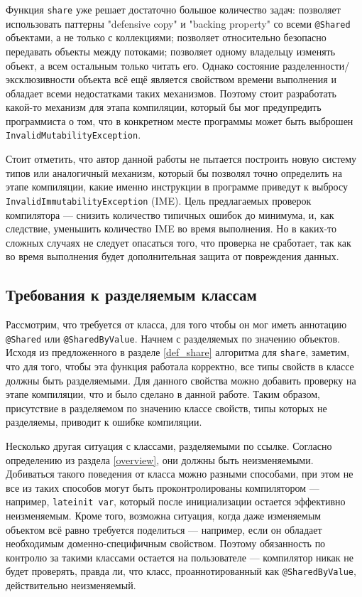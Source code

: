 \documentclass[specification,annotation,times]{itmo-student-thesis}
\begin{document}
Функция \texttt{share} уже решает достаточно большое количество задач: позволяет использовать паттерны "defensive copy" и "backing property" со всеми \texttt{@Shared} объектами, а не только с коллекциями; позволяет относительно безопасно передавать объекты между потоками; позволяет одному владельцу изменять объект, а всем остальным только читать его.
Однако состояние разделенности/эксклюзивности объекта всё ещё является свойством времени выполнения и обладает всеми недостатками таких механизмов. 
Поэтому стоит разработать какой-то механизм для этапа компиляции, который бы мог предупредить программиста о том, что в конкретном месте программы может быть выброшен \texttt{InvalidMutabilityException}.

Стоит отметить, что автор данной работы не пытается построить новую систему типов или аналогичный механизм, который бы позволял точно определить на этапе компиляции, какие именно инструкции в программе приведут к выбросу \texttt{InvalidImmutabilityException} (IME).
Цель предлагаемых проверок компилятора --- снизить количество типичных ошибок до минимума, и, как следствие, уменьшить количество IME во время выполнения.
Но в каких-то сложных случаях не следует опасаться того, что проверка не сработает,
так как во время выполнения будет дополнительная защита от повреждения данных.

\subsection{Требования к разделяемым классам}\label{shared_requirements}

Рассмотрим, что требуется от класса, для того чтобы он мог иметь аннотацию \texttt{@Shared} или \texttt{@SharedByValue}.
Начнем с разделяемых по значению объектов.
Исходя из предложенного в разделе \ref{def_share} алгоритма для
\texttt{share}, заметим, что для того, чтобы эта функция работала корректно,
все типы свойств в классе должны быть разделяемыми.
Для данного свойства можно добавить проверку на этапе компиляции, что и было сделано в данной работе.
Таким образом, присутствие в разделяемом  по значению классе свойств, типы которых не разделяемы, приводит к ошибке компиляции.

Несколько другая ситуация с классами, разделяемыми по ссылке. Согласно определению из раздела \ref{overview}, они должны быть неизменяемыми.
Добиваться такого поведения от класса можно разными способами, при этом не все из таких способов могут быть проконтролированы компилятором --- например, \texttt{lateinit var}, который после инициализации остается эффективно неизменяемым.
Кроме того, возможна ситуация, когда даже изменяемым объектом всё равно требуется поделиться --- например, если он обладает необходимым доменно-специфичным свойством.
Поэтому обязанность по контролю за такими классами остается на пользователе --- компилятор никак не будет проверять, правда ли, что класс, проаннотированный как \texttt{@SharedByValue}, действительно неизменяемый.
\end{document}
